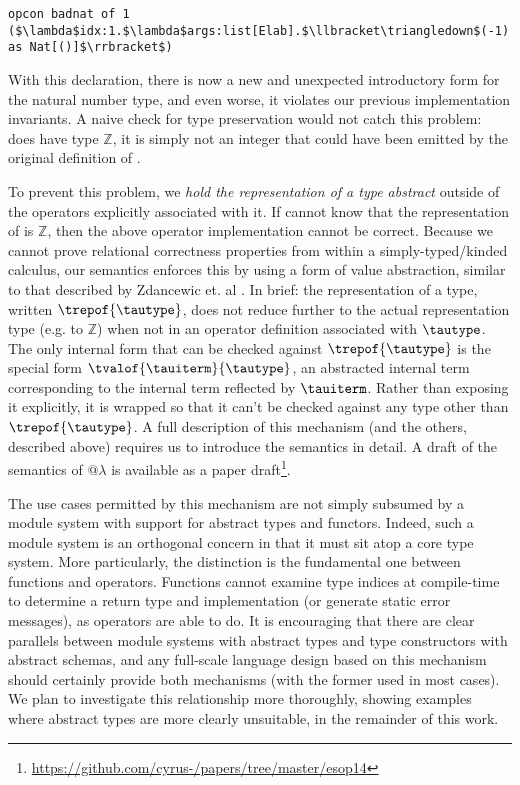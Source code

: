 \begin{lstlisting}
opcon badnat of 1 ($\lambda$idx:1.$\lambda$args:list[Elab].$\llbracket\triangledown$(-1) as Nat[()]$\rrbracket$)
\end{lstlisting}

With this declaration, there is now a new and unexpected introductory form for the natural number type, and even worse, it violates our previous implementation invariants. A naive check for type preservation would not catch this problem:  does have type $\mathbb{Z}$, it is simply not an integer that could have been emitted by the original definition of .

To prevent this problem, we \emph{hold the representation of a type abstract} outside of the operators explicitly associated with it. If  cannot know that the representation of  is $\mathbb{Z}$, then the above operator implementation cannot be correct. Because we cannot prove relational correctness properties from within a simply-typed/kinded calculus, our semantics enforces this by using a form of value abstraction, similar to that described by Zdancewic et. al \cite{zdancewic}. In brief: the representation of a type, written $\trepof{\tautype}$, does not reduce further to the actual representation type (e.g. to $\mathbb{Z}$) when not in an operator definition associated with $\tautype$. The only internal form that can be checked against  $\trepof{\tautype}$ is the special form $\tvalof{\tauiterm}{\tautype}$, an abstracted internal term corresponding to the internal term reflected by $\tauiterm$. Rather than exposing it explicitly, it is wrapped so that it can't be checked against any type other than $\trepof{\tautype}$. A full description of this mechanism (and the others, described above) requires us to introduce the semantics in detail. A draft of the semantics of @$\lambda$ is available as a paper draft\footnote{\url{https://github.com/cyrus-/papers/tree/master/esop14}}.


The use cases permitted by this mechanism are not simply subsumed by a module system with support for abstract types and functors. Indeed, such a module system is an orthogonal concern in that it must sit atop a core type system. More particularly, the distinction is the fundamental one between functions and operators. Functions cannot examine type indices at compile-time to determine a return type and implementation (or generate static error messages), as operators are able to do. It is encouraging that there are clear parallels between module systems with abstract types and type constructors with abstract schemas, and any full-scale language design based on this mechanism should certainly provide both mechanisms (with the former used in most cases). We plan to investigate this relationship more thoroughly, showing examples where abstract types are more clearly unsuitable, in the remainder of this work. 


